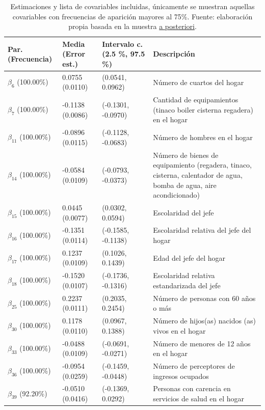\documentclass[11pt]{article}
\begin{document}
\begin{table}[H]
\caption{Estimaciones y lista de covariables incluidas, únicamente
se muestran aquellas covariables con frecuencias de aparición mayores al 75\%.
Fuente: elaboración propia basada en la muestra \underline{a posteriori}.}
\label{tab:covariables-beta}
\centering
\begin{tabular}[t]{l|l|l|l}
\hline
Par. (Frecuencia) & Media (Error est.) & Intervalo c. (2.5 \%, 97.5 \%) & Descripción\\
\hline
$\beta_{6}$ (100.00\%) & 0.0755 (0.0110) & (0.0541, 0.0962) & Número de cuartos del hogar\\
\hline
$\beta_{7}$ (100.00\%) & -0.1138 (0.0086) & (-0.1301, -0.0970) & Cantidad de equipamientos (tinaco boiler cisterna regadera) en el hogar\\
\hline
$\beta_{11}$ (100.00\%) & -0.0896 (0.0115) & (-0.1128, -0.0683) & Número de hombres en el hogar\\
\hline
$\beta_{14}$ (100.00\%) & -0.0584 (0.0109) & (-0.0793, -0.0373) & Número de bienes de equipamiento (regadera, tinaco, cisterna, calentador de agua, bomba de agua, aire acondicionado)\\
\hline
$\beta_{15}$ (100.00\%) & 0.0445 (0.0077) & (0.0302, 0.0594) & Escolaridad del jefe\\
\hline
$\beta_{16}$ (100.00\%) & -0.1351 (0.0114) & (-0.1585, -0.1138) & Escolaridad relativa del jefe del hogar\\
\hline
$\beta_{17}$ (100.00\%) & 0.1237 (0.0109) & (0.1026, 0.1439) & Edad del jefe del hogar\\
\hline
$\beta_{18}$ (100.00\%) & -0.1520 (0.0107) & (-0.1736, -0.1316) & Escolaridad relativa estandarizada del jefe\\
\hline
$\beta_{25}$ (100.00\%) & 0.2237 (0.0111) & (0.2035, 0.2454) & Número de personas con 60 años o más\\
\hline
$\beta_{30}$ (100.00\%) & 0.1178 (0.0110) & (0.0967, 0.1388) & Número de hijos(as) nacidos (as) vivos en el hogar\\
\hline
$\beta_{33}$ (100.00\%) & -0.0488 (0.0109) & (-0.0691, -0.0271) & Número de menores de 12 años en el hogar\\
\hline
$\beta_{36}$ (100.00\%) & -0.0954 (0.0259) & (-0.1459, -0.0448) & Número de perceptores de ingresos ocupados\\
\hline
$\beta_{39}$ (92.20\%) & -0.0510 (0.0416) & (-0.1369, 0.0292) & Personas con carencia en servicios de salud en el hogar\\

\end{tabular}
\end{table}
\end{document}
